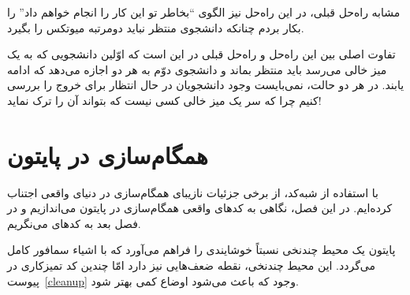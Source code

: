 \documentclass{book}
\newcommand{\clearemptydoublepage}{\newpage\cleardoublepage}
\begin{document}
    مشابه راه‌حل قبلی، در این راه‌حل نیز الگوی ``بخاطر تو این کار را انجام خواهم داد'' را بکار بردم چنانکه دانشجوی منتظر نباید دومرتبه میوتکس را بگیرد. 

    تفاوت اصلی بین این راه‌حل و راه‌حل قبلی در این است که اوّلین دانشجویی که به یک میز خالی می‌رسد باید منتظر بماند و دانشجوی دوّم به هر دو اجازه 
    می‌دهد که ادامه یابند. در هر دو حالت، نمی‌بایست وجود دانشجویان در حال انتظار برای خروج را بررسی کنیم چرا که سر یک میز خالی کسی نیست که بتواند
    آن را ترک نماید!
    










\chapter{همگام‌سازی در پایتون}
\label{pysync}

    با استفاده از شبه‌کد، از برخی جزئیات نازیبای همگام‌سازی در دنیای واقعی اجتناب کرده‌ایم. 
    در این فصل، نگاهی به کدهای واقعی همگام‌سازی در پایتون می‌اندازیم و در فصل بعد به کدهای  می‌نگریم. 

    پایتون  یک محیط چندنخی نسبتاً خوشایندی را فراهم می‌آورد که با اشیاء سمافور کامل می‌گردد. این محیط چندنخی، نقطه ضعف‌هایی نیز دارد امّا 
    چندین کد  تمیزکاری در پیوست~\ref{cleanup} وجود که باعث می‌شود اوضاع کمی بهتر شود. 
    
\end{document}
